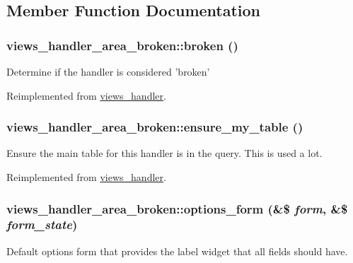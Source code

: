 \subsection{Member Function Documentation}
\hypertarget{classviews__handler__area__broken_ab7a2b86712be49f469134c315e8907ef}{
\subsubsection[{broken}]{\setlength{\rightskip}{0pt plus 5cm}views\_\-handler\_\-area\_\-broken::broken ()}}
\label{classviews__handler__area__broken_ab7a2b86712be49f469134c315e8907ef}
Determine if the handler is considered 'broken' 

Reimplemented from \hyperlink{classviews__handler_ac1cd2ff30cb558c79cc908be516fb725}{views\_\-handler}.\hypertarget{classviews__handler__area__broken_acd6bec7fca60efb5ae6fa4f37a77a9f6}{
\subsubsection[{ensure\_\-my\_\-table}]{\setlength{\rightskip}{0pt plus 5cm}views\_\-handler\_\-area\_\-broken::ensure\_\-my\_\-table ()}}
\label{classviews__handler__area__broken_acd6bec7fca60efb5ae6fa4f37a77a9f6}
Ensure the main table for this handler is in the query. This is used a lot. 

Reimplemented from \hyperlink{classviews__handler_a947f21ef0f21a77f4d103af4702b3600}{views\_\-handler}.\hypertarget{classviews__handler__area__broken_ac5f35dab0c0f8a2486e570fa8ec4e85a}{
\subsubsection[{options\_\-form}]{\setlength{\rightskip}{0pt plus 5cm}views\_\-handler\_\-area\_\-broken::options\_\-form (\&\$ {\em form}, \/  \&\$ {\em form\_\-state})}}
\label{classviews__handler__area__broken_ac5f35dab0c0f8a2486e570fa8ec4e85a}
Default options form that provides the label widget that all fields should have. 

